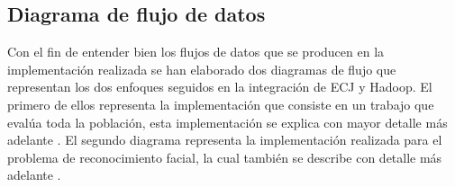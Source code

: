 
\subsection{Diagrama de flujo de datos}

Con el fin de entender bien los flujos de datos que se producen en la implementaci\'on realizada se han elaborado dos diagramas de flujo que representan los dos enfoques seguidos en la integraci\'on de ECJ y Hadoop. El primero de ellos  representa la implementación que consiste en un trabajo que eval\'ua toda la población, esta implementación se explica con mayor detalle m\'as adelante . El segundo diagrama representa la implementación realizada para el problema de reconocimiento facial, la cual también se describe con detalle m\'as adelante .


